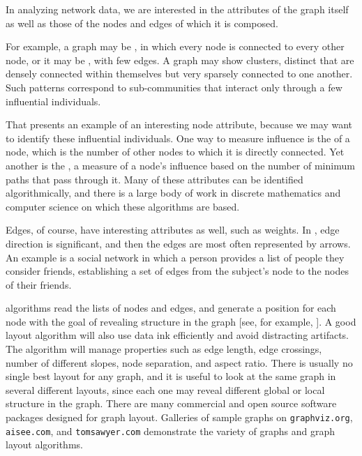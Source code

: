 In analyzing network data, we are interested in the attributes of the
graph itself as well as those of the nodes and edges of which it
is composed.

For example, a graph may be , in which every
node is connected to every other node, or it may be ,
with few edges.  A graph may show clusters, distinct 
that are densely connected within themselves but very sparsely
connected to one another.  Such patterns correspond to sub-communities
that interact only through a few influential individuals.

That presents an example of an interesting node attribute, because we
may want to identify these influential individuals.  One way to
measure influence is the  of a node, which is the number
of other nodes to which it is directly connected.  Yet another is the
, a measure of a node's influence based
on the number of minimum paths that pass through it. Many of these
attributes can be identified algorithmically, and there is a large
body of work in discrete mathematics and computer science on which
these algorithms are based.


Edges, of course, have interesting attributes as well, such as
weights.  In , edge direction is significant,
and then the edges are most often represented by arrows.  An example
is a social network in which a person provides a list of people they
consider friends, establishing a set of edges from the subject's node
to the nodes of their friends.

  algorithms read the lists of
nodes and edges, and generate a position for each node with the goal
of revealing structure in the graph [see, for example,
].  A good layout algorithm will also use data
ink efficiently and avoid distracting artifacts.  The algorithm will
manage properties such as edge length, edge crossings, number of
different slopes, node separation, and aspect ratio.  There is usually
no single best layout for any graph, and it is useful to look at the
same graph in several different layouts, since each one may reveal
different global or local structure in the graph. There are many
commercial and open source software packages designed for graph
layout.  Galleries of sample graphs on {\tt graphviz.org}, {\tt
aisee.com}, and {\tt tomsawyer.com} demonstrate the variety of graphs
and graph layout algorithms.

